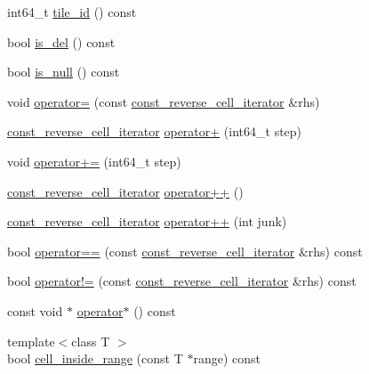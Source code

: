 \begin{DoxyCompactItemize}
\item 
int64\+\_\+t \hyperlink{classTile_1_1const__reverse__cell__iterator_aac63745c0dbdf9ed1b4643a994e60e1a}{tile\+\_\+id} () const 
\item 
bool \hyperlink{classTile_1_1const__reverse__cell__iterator_af9c5a9d1fa6f3c48dca0ec0dd256fe00}{is\+\_\+del} () const 
\item 
bool \hyperlink{classTile_1_1const__reverse__cell__iterator_ae9731acb536e8da867af05981d77f72d}{is\+\_\+null} () const 
\item 
void \hyperlink{classTile_1_1const__reverse__cell__iterator_ab8804a2b30f3550635314a6a2af59016}{operator=} (const \hyperlink{classTile_1_1const__reverse__cell__iterator}{const\+\_\+reverse\+\_\+cell\+\_\+iterator} \&rhs)
\item 
\hyperlink{classTile_1_1const__reverse__cell__iterator}{const\+\_\+reverse\+\_\+cell\+\_\+iterator} \hyperlink{classTile_1_1const__reverse__cell__iterator_abe50af33fa0ddaaa621dbec76245b29e}{operator+} (int64\+\_\+t step)
\item 
void \hyperlink{classTile_1_1const__reverse__cell__iterator_afd4e55468b0dc59faf7a40e7d69a2b0e}{operator+=} (int64\+\_\+t step)
\item 
\hyperlink{classTile_1_1const__reverse__cell__iterator}{const\+\_\+reverse\+\_\+cell\+\_\+iterator} \hyperlink{classTile_1_1const__reverse__cell__iterator_a87e63ce7dc2fa6d5fc5e5b8bd5bb5ac0}{operator++} ()
\item 
\hyperlink{classTile_1_1const__reverse__cell__iterator}{const\+\_\+reverse\+\_\+cell\+\_\+iterator} \hyperlink{classTile_1_1const__reverse__cell__iterator_a1adcd2322c5e3a6e093fe2cf591ca0ef}{operator++} (int junk)
\item 
bool \hyperlink{classTile_1_1const__reverse__cell__iterator_a17235ef582a4e03aea77696265924b46}{operator==} (const \hyperlink{classTile_1_1const__reverse__cell__iterator}{const\+\_\+reverse\+\_\+cell\+\_\+iterator} \&rhs) const 
\item 
bool \hyperlink{classTile_1_1const__reverse__cell__iterator_a05c3a176cb4558877ff92b4ca8a7ea44}{operator!=} (const \hyperlink{classTile_1_1const__reverse__cell__iterator}{const\+\_\+reverse\+\_\+cell\+\_\+iterator} \&rhs) const 
\item 
const void $\ast$ \hyperlink{classTile_1_1const__reverse__cell__iterator_ab30604c6b8a7515390276da73c0c1707}{operator$\ast$} () const 
\item 
{\footnotesize template$<$class T $>$ }\\bool \hyperlink{classTile_1_1const__reverse__cell__iterator_a2baa7f85cfe8201d595e650f5bebd331}{cell\+\_\+inside\+\_\+range} (const T $\ast$range) const 
\end{DoxyCompactItemize}
